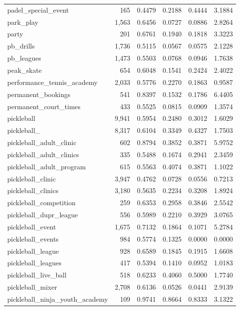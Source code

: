 \begin{table}[htbp]
\begin{tabular}{lrrrrr}
  padel\_special\_event & 165 & 0.4479 & 0.2188 & 0.4444 & 3.1884 \\
  park\_play & 1,563 & 0.6456 & 0.0727 & 0.0886 & 2.8264 \\
  party & 201 & 0.6761 & 0.1940 & 0.1818 & 3.3223 \\
  pb\_drills & 1,736 & 0.5115 & 0.0567 & 0.0575 & 2.1228 \\
  pb\_leagues & 1,473 & 0.5503 & 0.0768 & 0.0946 & 1.7638 \\
  peak\_skate & 654 & 0.6048 & 0.1541 & 0.2424 & 2.4022 \\
  performance\_tennis\_academy & 2,033 & 0.5776 & 0.2270 & 0.1863 & 0.9587 \\
  permanent\_bookings & 541 & 0.8397 & 0.1532 & 0.1786 & 6.4405 \\
  permanent\_court\_times & 433 & 0.5525 & 0.0815 & 0.0909 & 1.3574 \\
  pickleball & 9,941 & 0.5954 & 0.2480 & 0.3012 & 1.6029 \\
  pickleball\_ & 8,317 & 0.6104 & 0.3349 & 0.4327 & 1.7503 \\
  pickleball\_adult\_clinic & 602 & 0.8794 & 0.3852 & 0.3871 & 5.9752 \\
  pickleball\_adult\_clinics & 335 & 0.5488 & 0.1674 & 0.2941 & 2.3459 \\
  pickleball\_adult\_program & 615 & 0.5563 & 0.4074 & 0.3871 & 1.1022 \\
  pickleball\_clinic & 3,947 & 0.4762 & 0.0728 & 0.0556 & 0.7213 \\
  pickleball\_clinics & 3,180 & 0.5635 & 0.2234 & 0.3208 & 1.8924 \\
  pickleball\_competition & 259 & 0.6353 & 0.2958 & 0.3846 & 2.5542 \\
  pickleball\_dupr\_league & 556 & 0.5989 & 0.2210 & 0.3929 & 3.0765 \\
  pickleball\_event & 1,675 & 0.7132 & 0.1864 & 0.1071 & 5.2784 \\
  pickleball\_events & 984 & 0.5774 & 0.1325 & 0.0000 & 0.0000 \\
  pickleball\_league & 928 & 0.6589 & 0.1845 & 0.1915 & 1.6608 \\
  pickleball\_leagues & 417 & 0.5394 & 0.1410 & 0.0952 & 1.0183 \\
  pickleball\_live\_ball & 518 & 0.6233 & 0.4060 & 0.5000 & 1.7740 \\
  pickleball\_mixer & 2,708 & 0.6136 & 0.0526 & 0.0441 & 2.9139 \\
  pickleball\_ninja\_youth\_academy & 109 & 0.9741 & 0.8664 & 0.8333 & 3.1322 \\

\end{tabular}
\end{table}

